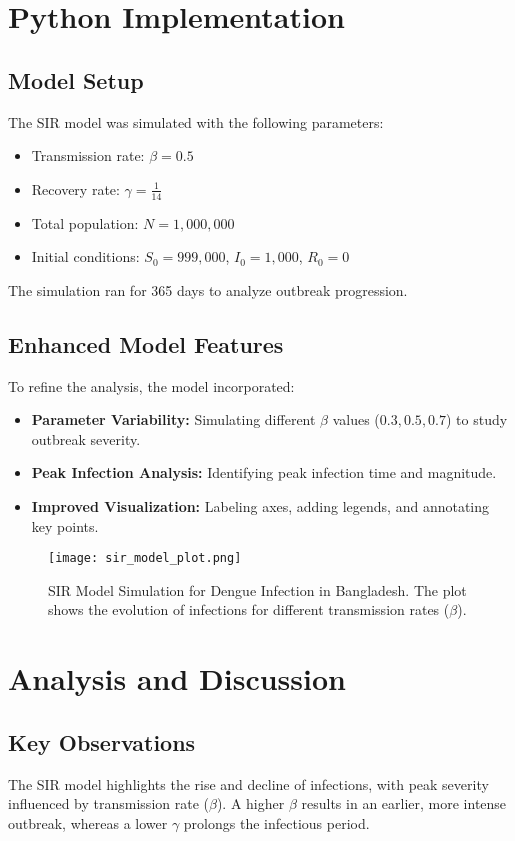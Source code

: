 \documentclass {article}
\begin{document}
\section*{Python Implementation}

\subsection*{Model Setup}
The SIR model was simulated with the following parameters:
\begin{itemize}
    \item Transmission rate: $\beta = 0.5$
    \item Recovery rate: $\gamma = \frac{1}{14}$
    \item Total population: $N = 1,000,000$
    \item Initial conditions: $S_0 = 999,000$, $I_0 = 1,000$, $R_0 = 0$
\end{itemize}
The simulation ran for 365 days to analyze outbreak progression.

\subsection*{Enhanced Model Features}
To refine the analysis, the model incorporated:
\begin{itemize}
    \item \textbf{Parameter Variability:} Simulating different $\beta$ values ($0.3, 0.5, 0.7$) to study outbreak severity.
    \item \textbf{Peak Infection Analysis:} Identifying peak infection time and magnitude.
    \item \textbf{Improved Visualization:} Labeling axes, adding legends, and annotating key points.
\end{itemize}

\begin{figure}[H]
    \centering
    \texttt{[image: sir\_model\_plot.png]}
    \caption{SIR Model Simulation for Dengue Infection in Bangladesh. The plot shows the evolution of infections for different transmission rates ($\beta$).}
    \label{fig:sir_model}
\end{figure}

\section*{Analysis and Discussion}

\subsection*{Key Observations}
The SIR model highlights the rise and decline of infections, with peak severity influenced by transmission rate ($\beta$). A higher $\beta$ results in an earlier, more intense outbreak, whereas a lower $\gamma$ prolongs the infectious period.
\end{document}
